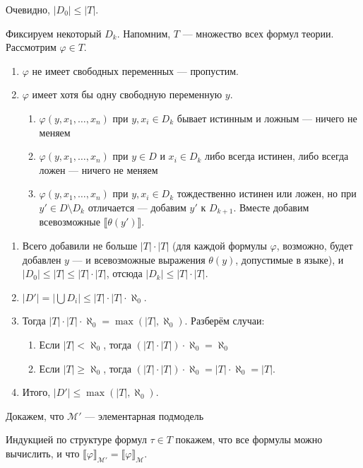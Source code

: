 Очевидно, $|D_0| \le |T|$.

Фиксируем некоторый $D_k$. Напомним, $T$ --- множество всех формул теории. Рассмотрим $\varphi \in T$.
\begin{enumerate}
\item $\varphi$ не имеет свободных переменных --- пропустим.
\item $\varphi$ имеет хотя бы одну свободную переменную $y$.
\begin{enumerate}
\item $\varphi (y, x_1, \dots, x_n)$ при $y,x_i \in D_k$ бывает истинным и ложным --- ничего не меняем
\item $\varphi (y, x_1, \dots, x_n)$ при $y \in D$ и $x_i \in D_k$ либо всегда истинен, либо всегда ложен --- ничего не меняем
\item $\varphi (y, x_1, \dots, x_n)$ при $y,x_i \in D_k$ тождественно истинен или ложен, но при $y' \in D \setminus D_k$ отличается --- добавим $y'$ к $D_{k+1}$. Вместе добавим всевозможные $\llbracket\theta(y')\rrbracket$.
\end{enumerate}
\end{enumerate}

\begin{enumerate}
\item Всего добавили не больше $|T| \cdot |T|$ (для каждой формулы $\varphi$, возможно, будет добавлен $y$ --- и всевозможные выражения $\theta(y)$, допустимые в языке), и $|D_0| \le |T| \le |T|\cdot|T|$, отсюда $|D_k| \le |T| \cdot |T|$.
\item $|D'| = |\bigcup D_i| \le |T| \cdot |T| \cdot \aleph_0$.
\item Тогда $|T| \cdot |T| \cdot \aleph_0 = \max(|T|,\aleph_0)$. Разберём случаи:
\begin{enumerate}
\item Если $|T| < \aleph_0$, тогда $(|T| \cdot |T|) \cdot \aleph_0 = \aleph_0$
\item Если $|T| \ge \aleph_0$, тогда $(|T| \cdot |T|) \cdot \aleph_0 = |T| \cdot \aleph_0 = |T|$.
\end{enumerate}
\item Итого, $|D'| \le \max(|T|,\aleph_0)$.
\end{enumerate}

Докажем, что $\mathcal{M}'$ --- элементарная подмодель

Индукцией по структуре формул $\tau \in T$ покажем, что все формулы можно вычислить, и что $\llbracket \varphi \rrbracket_\mathcal{M'} = \llbracket \varphi \rrbracket_\mathcal{M}$.

